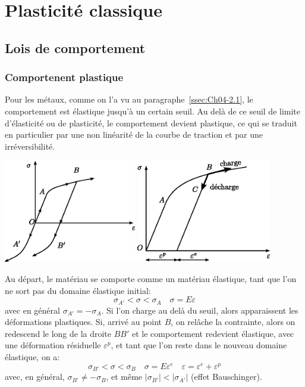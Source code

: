 \chapter{Plasticité classique} \label{chap:Ch10}
\section{Lois de comportement} \label{sec:Ch10-1}
\subsection{Comportenent plastique} \label{ssec:Ch10-1.1}
Pour les métaux, comme on l'a vu au paragraphe~\ref{ssec:Ch04-2.1}, le comportement est élastique jusqu'à un certain seuil.
Au delà de ce seuil de limite d'élasticité ou de plasticité, le comportement devient plastique, ce qui se traduit en particulier par une non linéarité de la courbe de traction et par une irréversibilité.
\begin{center}
    \centering
    \includegraphics[height=4.5cm]{../images/T1_Ch10-01.eps}\quad
    \includegraphics[height=4.5cm]{../images/T1_Ch10-02.eps}
\end{center}

Au départ, le matériau se comporte comme un matériau élastique, tant que l'on ne sort pas du domaine élastique initial: 
\begin{equation}
    \sigma_{A'} < \sigma < \sigma_A \quad \sigma = E \varepsilon
    \label{eq:Ch10-001}
\end{equation}
avec en général $\sigma_{A'} = - \sigma_A$.
Si l'on charge au delà du seuil, alors apparaissent les déformations plastiques.
Si, arrivé au point $B$, on relâche la contrainte, alors on redescend le long de la droite $BB'$ et le comportement redevient élastique, avec une déformation résiduelle $\varepsilon^p$, et tant que l'on reste dans le nouveau domaine élastique, on a: 
\begin{equation}
    \sigma_{B'} < \sigma <\sigma_B \quad \sigma=E \varepsilon^e \quad \varepsilon = \varepsilon^e + \varepsilon^p
    \label{eq:Ch10-002}
\end{equation}
avec, en général, $\sigma_{B'}\neq - \sigma_{B}$, et même $|\sigma_{B'}|<|\sigma_{A'}|$ (effet Bauschinger). 

